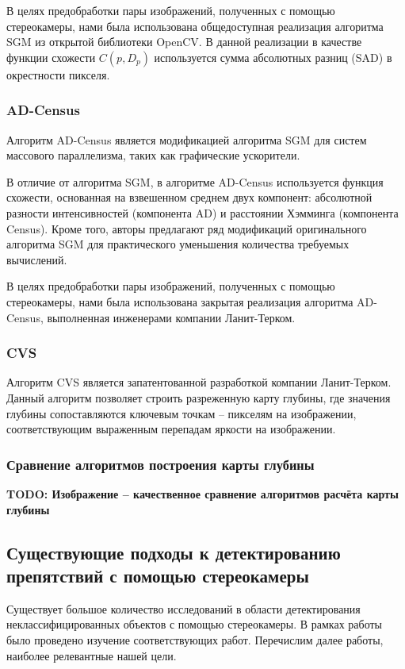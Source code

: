 \documentclass[aps,%
14pt,%
final,%
oneside,
onecolumn,%
musixtex, %
superscriptaddress,%
centertags]{extarticle} %
\begin{document}
В целях предобработки пары изображений, полученных с помощью стереокамеры, нами была использована общедоступная реализация алгоритма SGM из открытой библиотеки OpenCV. В данной реализации в качестве функции схожести $C(p, D_p)$ используется сумма абсолютных разниц (SAD) в окрестности пикселя.

\subsubsection{AD-Census}
Алгоритм AD-Census \cite{mei2011building} является модификацией алгоритма SGM для систем массового параллелизма, таких как графические ускорители.

В отличие от алгоритма SGM, в алгоритме AD-Census используется функция схожести, основанная на взвешенном среднем двух компонент: абсолютной разности интенсивностей (компонента AD) и расстоянии Хэмминга (компонента Census). Кроме того, авторы предлагают ряд модификаций оригинального алгоритма SGM для практического уменьшения количества требуемых вычислений.

В целях предобработки пары изображений, полученных с помощью стереокамеры, нами была использована закрытая реализация алгоритма AD-Census, выполненная инженерами компании Ланит-Терком.


\subsubsection{CVS}
Алгоритм CVS является запатентованной разработкой компании Ланит-Терком. Данный алгоритм позволяет строить разреженную карту глубины, где значения глубины сопоставляются ключевым точкам -- пикселям на изображении, соответствующим выраженным перепадам яркости на изображении.

\subsubsection{Сравнение алгоритмов построения карты глубины}

\textbf{\Large \color{Red} TODO: Изображение -- качественное сравнение алгоритмов расчёта карты глубины}

\subsection{Существующие подходы к детектированию препятствий с помощью стереокамеры}

Существует большое количество исследований в области детектирования неклассифицированных объектов с помощью стереокамеры. В рамках работы было проведено изучение соответствующих работ. Перечислим далее работы, наиболее  релевантные нашей цели.
\end{document}
